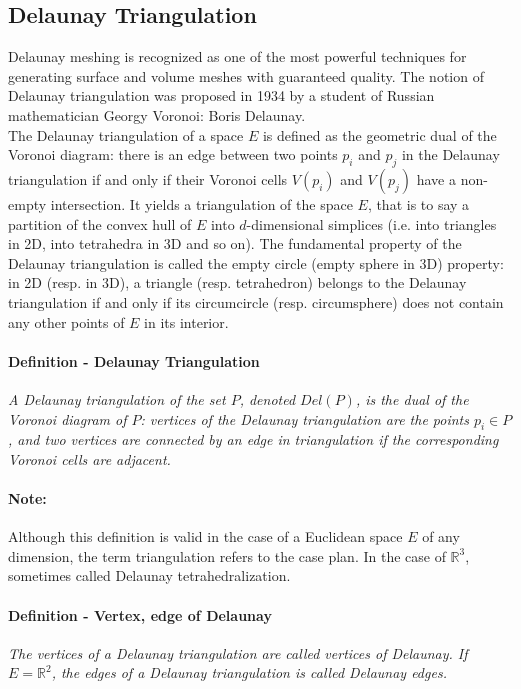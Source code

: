 \subsection{Delaunay Triangulation}

Delaunay meshing is recognized as one of the most powerful techniques for generating surface and volume meshes with guaranteed quality. The notion of Delaunay triangulation was proposed in 1934 by a student of Russian mathematician Georgy Voronoi: Boris Delaunay. \\
The Delaunay triangulation of a space $E$ is defined as the geometric dual of the Voronoi diagram: there is an edge between two points $p_{i}$ and $p_{j}$ in the Delaunay triangulation if and only if their Voronoi cells $V(p_{i})$ and $V(p_{j})$ have a non-empty intersection. It yields a triangulation of the space $E$, that is to say a partition of the convex hull of $E$ into $d$-dimensional simplices (i.e. into triangles in 2D, into tetrahedra in 3D and so on). The fundamental property of the Delaunay triangulation is called the empty circle (empty sphere in 3D) property: in 2D (resp. in 3D), a triangle (resp. tetrahedron) belongs to the Delaunay triangulation if and only if its circumcircle (resp. circumsphere) does not contain any other points of $E$ in its interior. \\

\paragraph{Definition - Delaunay Triangulation}
{
\it A Delaunay triangulation of the set $P$, denoted $Del(P)$, is the dual of the Voronoi diagram of $P$: vertices of the Delaunay triangulation are the points $p_{i} \in P$, and two vertices are connected by an edge in triangulation if the corresponding Voronoi cells are adjacent.
}

\paragraph{Note:}
{
Although this definition is valid in the case of a Euclidean space $E$ of any dimension, the term triangulation refers to the case plan. In the case of $\mathbb{R}^{3}$, sometimes called Delaunay tetrahedralization.
}

\paragraph{Definition - Vertex, edge of Delaunay}
{
\it The vertices of a Delaunay triangulation are called vertices of Delaunay. If $E = \mathbb{R}^{2}$, the edges of a Delaunay triangulation is called Delaunay edges.
}

